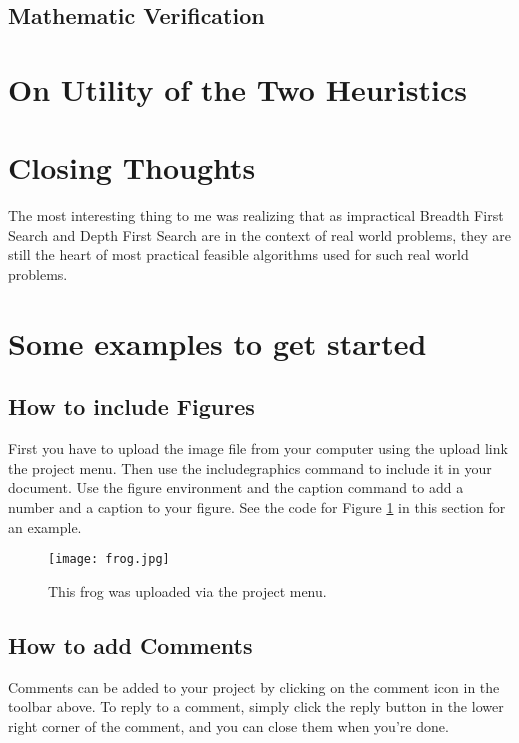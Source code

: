\documentclass[a4paper]{article}
\begin{document}
\subsection{Mathematic Verification} %

\section{On Utility of the Two Heuristics}

\section{Closing Thoughts}
The most interesting thing to me was realizing that as impractical Breadth First Search and
Depth First Search are in the context of real world problems, they are still the
heart of most practical feasible algorithms used for such real world problems.

\section{Some examples to get started}

\subsection{How to include Figures}

First you have to upload the image file from your computer using the upload link the project menu. Then use the includegraphics command to include it in your document. Use the figure environment and the caption command to add a number and a caption to your figure. See the code for Figure \ref{fig:frog} in this section for an example.

\begin{figure}
\centering
\texttt{[image: frog.jpg]}
\caption{\label{fig:frog}This frog was uploaded via the project menu.}
\end{figure}

\subsection{How to add Comments}

Comments can be added to your project by clicking on the comment icon in the toolbar above. %
%
%
To reply to a comment, simply click the reply button in the lower right corner of the comment, and you can close them when you're done.
\end{document}
